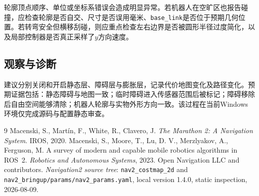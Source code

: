 \documentclass[UTF8,zihao=-4]{ctexart}
\begin{document}
轮廓顶点顺序、单位或坐标系错误会造成明显异常。若机器人在空旷区也报告碰撞，应检查轮廓是否自交、尺寸是否误用毫米、\texttt{base\_link}是否位于预期几何位置。若转弯安全但横移刮碰，则应重点检查左右边界是否被圆形半径过度简化，以及局部控制器是否真正采样了$y$方向速度。

\subsection*{观察与诊断}

建议分别关闭和开启静态层、障碍层与膨胀层，记录代价地图变化及路径变化。预期证据包括：静态障碍与地图一致；临时障碍进入传感器范围后被标记；障碍移除后自由空间能够清除；机器人轮廓与实物外形方向一致。该过程在当前Windows环境仅完成源码与配置静态审查。

\begin{thebibliography}{9}
 Macenski, S., Martín, F., White, R., Clavero, J. \emph{The Marathon 2: A Navigation System}. IROS, 2020.
 Macenski, S., Moore, T., Lu, D. V., Merzlyakov, A., Ferguson, M. A survey of modern and capable mobile robotics algorithms in ROS~2. \emph{Robotics and Autonomous Systems}, 2023.
 Open Navigation LLC and contributors. \emph{Navigation2 source tree}: \texttt{nav2\_costmap\_2d} and \texttt{nav2\_bringup/params/nav2\_params.yaml}, local version 1.4.0, static inspection, 2026-08-09.
\end{thebibliography}
\end{document}
